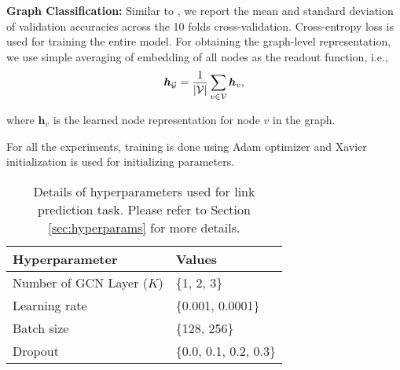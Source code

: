 \documentclass{article} \usepackage{iclr2020_conference,times}
\begin{document}
\noindent \textbf{Graph Classification:} Similar to \cite{graph_datasets,gin}, we report the mean and standard deviation of validation accuracies across the 10 folds cross-validation. Cross-entropy loss is used for training the entire model. For obtaining the graph-level representation, we use simple averaging of embedding of all nodes as the readout function, i.e.,
\[
\bm{h}_{\mathcal{G}} = \dfrac{1}{|\mathcal{V}|}\sum_{v \in \mathcal{V}} \bm{h}_v,
\]

where $\bm{h}_v$ is the learned node representation for node $v$ in the graph. 


For all the experiments, training is done using Adam optimizer \citep{adam_opt} and Xavier initialization \citep{xavier_init} is used for initializing parameters.
	
\begin{table}[h]
	\centering
	\small
	\begin{tabular}{ll}
		\toprule
		Hyperparameter                 & Values 					\\
		\midrule
		Number of GCN Layer ($K$) & \{1, 2, 3\}			\\
		Learning rate                  & \{0.001, 0.0001\}			\\
		Batch size                     & \{128, 256\}			\\
		Dropout  & \{0.0, 0.1, 0.2, 0.3\}		\\
		\bottomrule
	\end{tabular}
	\caption{Details of hyperparameters used for link prediction task. Please refer to Section \ref{sec:hyperparams} for more details.}
	\label{table:hyperparams}
\end{table}
 
\end{document}
